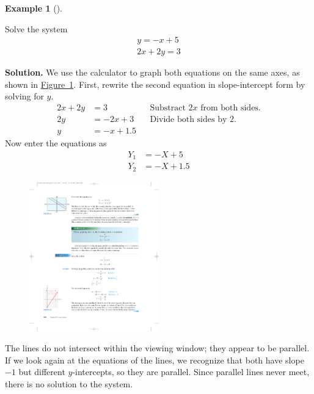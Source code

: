\documentclass[10pt,]{book}
\theoremstyle{plain}
\theoremstyle{definition}
\theoremstyle{definition}
\newtheorem{example}[theorem]{Example}
\theoremstyle{definition}
\theoremstyle{definition}
\numberwithin{equation}{section}
\newcommand{\amp}{ & }
\begin{document}
%
\begin{example}[]\label{example-inconsistent-system}

		Solve the system
		\begin{gather*}

				y = −x + 5
			\\

				2x + 2y = 3
			
\end{gather*}
\par\medskip\noindent%
\textbf{Solution.}\quad 
		We use the calculator to graph both equations on the same axes, as shown in \hyperref[fig-GC-parallel-lines]{Figure~\ref{fig-GC-parallel-lines}}. First, rewrite the second equation in slope-intercept form by solving for \(y\).
		\begin{align*}

				2x + 2y \amp = 3\amp\amp\text{Substract } 2x \text{ from both sides.}
			\\

				2y \amp = −2x + 3\amp\amp\text{Divide both sides by 2.}
			\\

				y \amp = −x + 1.5
			
\end{align*}
		Now enter the equations as
		\begin{align*}

				Y_1 \amp= −X + 5
			\\

				Y_2 \amp = −X + 1.5
			
\end{align*}
		\leavevmode%
\begin{figure}
\centering
\includegraphics[width=0.50\textwidth,]{images/fig-GC-parallel-lines.pdf}\caption{\label{fig-GC-parallel-lines}}
\end{figure}

		The lines do not intersect within the viewing window; they appear to be parallel. If we look again at the equations of the lines, we recognize that both have slope \(-1\) but different \(y\)-intercepts, so they are parallel. Since parallel lines never meet, there is no solution to the system.
\end{example}
\par
\end{document}
